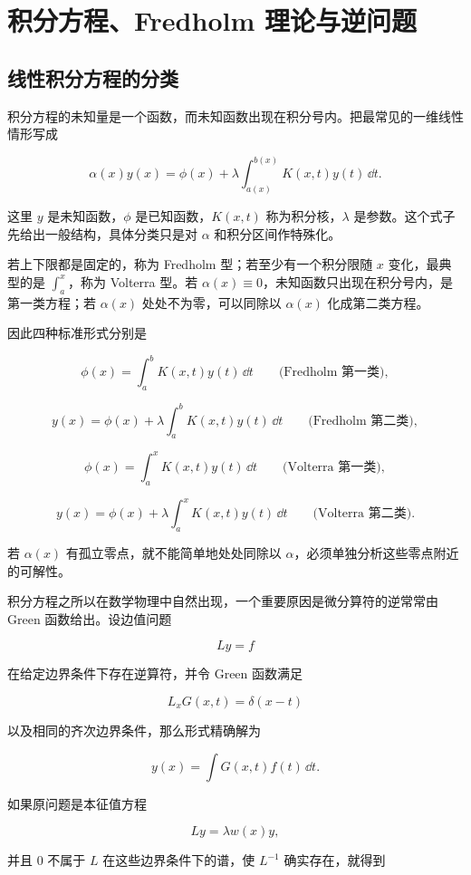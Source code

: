 \chapter{积分方程、Fredholm 理论与逆问题}
\label{chap:integral-equations}

\section{线性积分方程的分类}

积分方程的未知量是一个函数，而未知函数出现在积分号内。把最常见的一维线性情形写成

\[
\alpha(x)y(x)
=\phi(x)+\lambda\int_{a(x)}^{b(x)}K(x,t)y(t)\,\dd t.
\]

这里 $y$ 是未知函数，$\phi$ 是已知函数，$K(x,t)$ 称为积分核，$\lambda$ 是参数。这个式子先给出一般结构，具体分类只是对 $\alpha$ 和积分区间作特殊化。

若上下限都是固定的，称为 Fredholm 型；若至少有一个积分限随 $x$ 变化，最典型的是 $\int_a^x$，称为 Volterra 型。若 $\alpha(x)\equiv0$，未知函数只出现在积分号内，是第一类方程；若 $\alpha(x)$ 处处不为零，可以同除以 $\alpha(x)$ 化成第二类方程。

因此四种标准形式分别是

\[
\phi(x)=\int_a^bK(x,t)y(t)\,\dd t
\qquad\text{(Fredholm 第一类)},
\]

\[
y(x)=\phi(x)+\lambda\int_a^bK(x,t)y(t)\,\dd t
\qquad\text{(Fredholm 第二类)},
\]

\[
\phi(x)=\int_a^xK(x,t)y(t)\,\dd t
\qquad\text{(Volterra 第一类)},
\]

\[
y(x)=\phi(x)+\lambda\int_a^xK(x,t)y(t)\,\dd t
\qquad\text{(Volterra 第二类)}.
\]

若 $\alpha(x)$ 有孤立零点，就不能简单地处处同除以 $\alpha$，必须单独分析这些零点附近的可解性。

积分方程之所以在数学物理中自然出现，一个重要原因是微分算符的逆常常由 Green 函数给出。设边值问题

\[
Ly=f
\]

在给定边界条件下存在逆算符，并令 Green 函数满足

\[
L_xG(x,t)=\delta(x-t)
\]

以及相同的齐次边界条件，那么形式精确解为

\[
{
y(x)=\int G(x,t)f(t)\,\dd t
}.
\]

如果原问题是本征值方程

\[
Ly=\lambda w(x)y,
\]

并且 $0$ 不属于 $L$ 在这些边界条件下的谱，使 $L^{-1}$ 确实存在，就得到

